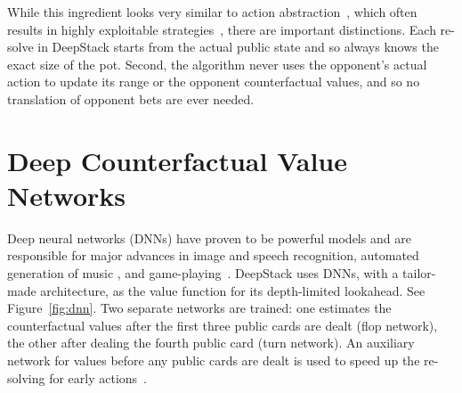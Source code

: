 \documentclass[12pt]{article}
\begin{document}
While this ingredient looks very similar to action abstraction~\cite{Gilpin08:Tartanian,Schnizlein09:Translation}, which often results in highly exploitable strategies~\cite{Lisy16:LocalBR}, there are important distinctions.  Each re-solve in DeepStack starts from the actual public state and so always knows the exact size of the pot.  Second, the algorithm never uses the opponent's actual action to update its range or the opponent counterfactual values, and so no translation of opponent bets are ever needed.  

\section*{Deep Counterfactual Value Networks}

Deep neural networks (DNNs) have proven to be powerful models and are responsible for major advances in image and speech recognition\cite{Krizhevsky12:ImageNet,Hinton12:Speech}, automated generation of music \cite{Oord16:WaveNet}, and game-playing~\cite{Mnih15:DQN,Silver16:AlphaGo}.
DeepStack uses DNNs, with a tailor-made architecture, as the value function for its depth-limited lookahead.
See Figure~\ref{fig:dnn}.  Two separate networks are trained: one estimates the counterfactual values after the first three public cards are dealt (flop network), the other after dealing the fourth public card (turn network). An auxiliary network for values before any public cards are dealt is used to speed up the re-solving for early actions~\cite{SOM}.
\end{document}
